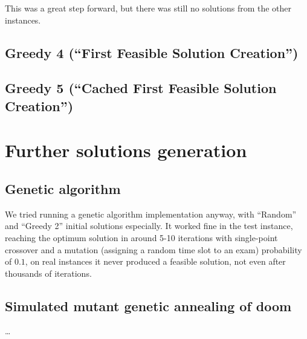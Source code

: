 \documentclass[11pt, a4paper, leqno]{article}
\begin{document}
	This was a great step forward, but there was still no solutions from the other instances.

	
	\subsection{Greedy 4 (``First Feasible Solution Creation'')}
	
	\subsection{Greedy 5 (``Cached First Feasible Solution Creation'')}
	
	
	
	\section{Further solutions generation}
	
	\subsection{Genetic algorithm}
	
	We tried running a genetic algorithm implementation anyway, with ``Random'' and ``Greedy 2'' initial solutions especially. It worked fine in the test instance, reaching the optimum solution in around 5-10 iterations with single-point crossover and a mutation (assigning a random time slot to an exam) probability of $0.1$, on real instances it never produced a feasible solution, not even after thousands of iterations.
	
	\subsection{Simulated mutant genetic annealing of doom\texttrademark}
	
	\dots
	
\end{document}
